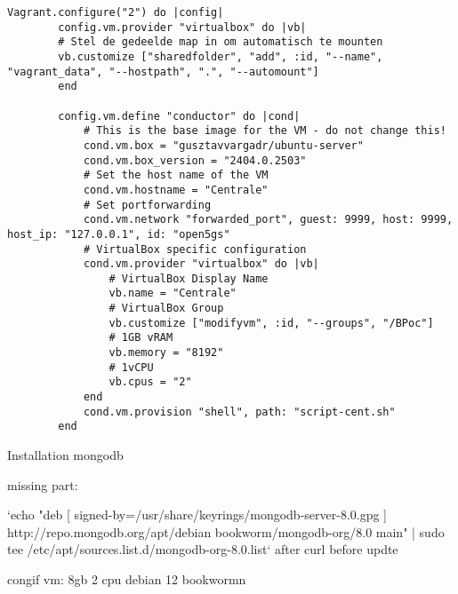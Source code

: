 \begin{lstlisting}[language=vagrant, caption=Vagrantfile]
    Vagrant.configure("2") do |config|
        config.vm.provider "virtualbox" do |vb|
        # Stel de gedeelde map in om automatisch te mounten
        vb.customize ["sharedfolder", "add", :id, "--name", "vagrant_data", "--hostpath", ".", "--automount"]
        end

        config.vm.define "conductor" do |cond|
            # This is the base image for the VM - do not change this!
            cond.vm.box = "gusztavvargadr/ubuntu-server"
            cond.vm.box_version = "2404.0.2503"
            # Set the host name of the VM
            cond.vm.hostname = "Centrale"
            # Set portforwarding
            cond.vm.network "forwarded_port", guest: 9999, host: 9999, host_ip: "127.0.0.1", id: "open5gs"
            # VirtualBox specific configuration
            cond.vm.provider "virtualbox" do |vb|
                # VirtualBox Display Name
                vb.name = "Centrale"
                # VirtualBox Group
                vb.customize ["modifyvm", :id, "--groups", "/BPoc"]
                # 1GB vRAM
                vb.memory = "8192"
                # 1vCPU
                vb.cpus = "2"
            end
            cond.vm.provision "shell", path: "script-cent.sh"
        end
\end{lstlisting}


Installation mongodb

missing part: 

`echo "deb [ signed-by=/usr/share/keyrings/mongodb-server-8.0.gpg ] http://repo.mongodb.org/apt/debian bookworm/mongodb-org/8.0 main" | sudo tee /etc/apt/sources.list.d/mongodb-org-8.0.list`
after curl before updte

congif vm: 8gb 2 cpu debian 12 bookwormn